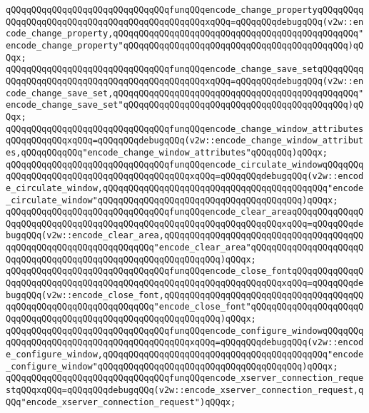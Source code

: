 \verb|qQQqqQQqqQQqqQQqqQQqqQQqqQQqqQQqfunqQQqencode_change_propertyqQQqqQQqqQQqqQQqqQQqqQQqqQQqqQQqqQQqqQQqqQQqqQQqxqQQq=qQQqqQQqdebugqQQq(v2w::encode_change_property,qQQqqQQqqQQqqQQqqQQqqQQqqQQqqQQqqQQqqQQqqQQqqQQq"encode_change_property"qQQqqQQqqQQqqQQqqQQqqQQqqQQqqQQqqQQqqQQqqQQq)qQQqx;|\newline
\verb|qQQqqQQqqQQqqQQqqQQqqQQqqQQqqQQqfunqQQqencode_change_save_setqQQqqQQqqQQqqQQqqQQqqQQqqQQqqQQqqQQqqQQqqQQqqQQqxqQQq=qQQqqQQqdebugqQQq(v2w::encode_change_save_set,qQQqqQQqqQQqqQQqqQQqqQQqqQQqqQQqqQQqqQQqqQQqqQQq"encode_change_save_set"qQQqqQQqqQQqqQQqqQQqqQQqqQQqqQQqqQQqqQQqqQQq)qQQqx;|\newline
\verb|qQQqqQQqqQQqqQQqqQQqqQQqqQQqqQQqfunqQQqencode_change_window_attributesqQQqqQQqqQQqxqQQq=qQQqqQQqdebugqQQq(v2w::encode_change_window_attributes,qQQqqQQqqQQq"encode_change_window_attributes"qQQqqQQq)qQQqx;|\newline
\verb|qQQqqQQqqQQqqQQqqQQqqQQqqQQqqQQqfunqQQqencode_circulate_windowqQQqqQQqqQQqqQQqqQQqqQQqqQQqqQQqqQQqqQQqqQQqxqQQq=qQQqqQQqdebugqQQq(v2w::encode_circulate_window,qQQqqQQqqQQqqQQqqQQqqQQqqQQqqQQqqQQqqQQqqQQq"encode_circulate_window"qQQqqQQqqQQqqQQqqQQqqQQqqQQqqQQqqQQqqQQq)qQQqx;|\newline
\verb|qQQqqQQqqQQqqQQqqQQqqQQqqQQqqQQqfunqQQqencode_clear_areaqQQqqQQqqQQqqQQqqQQqqQQqqQQqqQQqqQQqqQQqqQQqqQQqqQQqqQQqqQQqqQQqqQQqxqQQq=qQQqqQQqdebugqQQq(v2w::encode_clear_area,qQQqqQQqqQQqqQQqqQQqqQQqqQQqqQQqqQQqqQQqqQQqqQQqqQQqqQQqqQQqqQQqqQQq"encode_clear_area"qQQqqQQqqQQqqQQqqQQqqQQqqQQqqQQqqQQqqQQqqQQqqQQqqQQqqQQqqQQqqQQq)qQQqx;|\newline
\verb|qQQqqQQqqQQqqQQqqQQqqQQqqQQqqQQqfunqQQqencode_close_fontqQQqqQQqqQQqqQQqqQQqqQQqqQQqqQQqqQQqqQQqqQQqqQQqqQQqqQQqqQQqqQQqqQQqxqQQq=qQQqqQQqdebugqQQq(v2w::encode_close_font,qQQqqQQqqQQqqQQqqQQqqQQqqQQqqQQqqQQqqQQqqQQqqQQqqQQqqQQqqQQqqQQqqQQq"encode_close_font"qQQqqQQqqQQqqQQqqQQqqQQqqQQqqQQqqQQqqQQqqQQqqQQqqQQqqQQqqQQqqQQq)qQQqx;|\newline
\verb|qQQqqQQqqQQqqQQqqQQqqQQqqQQqqQQqfunqQQqencode_configure_windowqQQqqQQqqQQqqQQqqQQqqQQqqQQqqQQqqQQqqQQqqQQqxqQQq=qQQqqQQqdebugqQQq(v2w::encode_configure_window,qQQqqQQqqQQqqQQqqQQqqQQqqQQqqQQqqQQqqQQqqQQq"encode_configure_window"qQQqqQQqqQQqqQQqqQQqqQQqqQQqqQQqqQQqqQQq)qQQqx;|\newline
\verb|qQQqqQQqqQQqqQQqqQQqqQQqqQQqqQQqfunqQQqencode_xserver_connection_requestqQQqxqQQq=qQQqqQQqdebugqQQq(v2w::encode_xserver_connection_request,qQQq"encode_xserver_connection_request")qQQqx;|\newline
